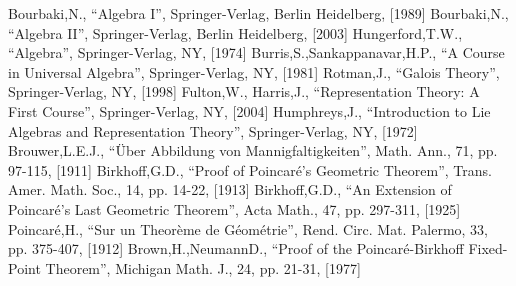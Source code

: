\documentclass[aps,twocolumn,secnumarabic,nobalancelastpage,amsmath,amssymb,
amsthm,nofootinbib,parskip=full]{revtex4}
\numberwithin{equation}{section}
\begin{document}
\begin{thebibliography}{99}
Bourbaki,N., ``Algebra I'', Springer-Verlag, Berlin Heidelberg, [1989]
Bourbaki,N., ``Algebra II'', Springer-Verlag, Berlin Heidelberg, [2003]
Hungerford,T.W., ``Algebra'', Springer-Verlag, NY, [1974]
Burris,S.,Sankappanavar,H.P., ``A Course in Universal Algebra'', Springer-Verlag, NY, [1981]
Rotman,J., ``Galois Theory'', Springer-Verlag, NY, [1998]
Fulton,W., Harris,J., ``Representation Theory: A First Course'', Springer-Verlag, NY, [2004]
Humphreys,J., ``Introduction to Lie Algebras and Representation Theory'', Springer-Verlag, NY, [1972]
Brouwer,L.E.J., ``\"Uber Abbildung von Mannigfaltigkeiten'', Math. Ann., 71, pp. 97-115, [1911]
Birkhoff,G.D., ``Proof of Poincar\'e's Geometric Theorem'', Trans. Amer. Math. Soc., 14, pp. 14-22, [1913]
Birkhoff,G.D., ``An Extension of Poincar\'e's Last Geometric Theorem'', Acta Math., 47, pp. 297-311, [1925]
Poincar\'e,H., ``Sur un Theor\`eme de G\'eom\'etrie'', Rend. Circ. Mat. Palermo, 33, pp. 375-407, [1912]
Brown,H.,NeumannD., ``Proof of the Poincar\'e-Birkhoff Fixed-Point Theorem'', Michigan Math. J., 24, pp. 21-31, [1977]

\end{thebibliography}
\end{document}
